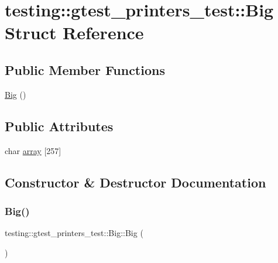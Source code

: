 \hypertarget{structtesting_1_1gtest__printers__test_1_1_big}{}\section{testing\+:\+:gtest\+\_\+printers\+\_\+test\+:\+:Big Struct Reference}
\label{structtesting_1_1gtest__printers__test_1_1_big}
\subsection*{Public Member Functions}
\begin{DoxyCompactItemize}
\item 
\hyperlink{structtesting_1_1gtest__printers__test_1_1_big_adb57fb0e14adb81177e3bfd7ed39966c}{Big} ()
\end{DoxyCompactItemize}
\subsection*{Public Attributes}
\begin{DoxyCompactItemize}
\item 
char \hyperlink{structtesting_1_1gtest__printers__test_1_1_big_a863911a8ec5c3bbe79c44d399f1de61f}{array} \mbox{[}257\mbox{]}
\end{DoxyCompactItemize}


\subsection{Constructor \& Destructor Documentation}
\mbox{\label{structtesting_1_1gtest__printers__test_1_1_big_adb57fb0e14adb81177e3bfd7ed39966c}} 
\subsubsection{\texorpdfstring{Big()}{Big()}}
{\footnotesize\ttfamily testing\+::gtest\+\_\+printers\+\_\+test\+::\+Big\+::\+Big (\begin{DoxyParamCaption}{ }\end{DoxyParamCaption})\hspace{0.3cm}{\ttfamily [inline]}}



